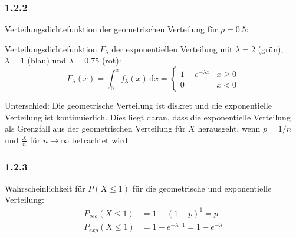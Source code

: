 \subsubsection*{1.2.2}
Verteilungsdichtefunktion der geometrischen Verteilung für $p = 0.5$:
\begin{center}
\end{center}
Verteilungsdichtefunktion $F_\lambda$ der exponentiellen Verteilung mit $\lambda = 2$ (grün), $\lambda = 1$ (blau) und $\lambda = 0.75$ (rot):
\begin{equation*}
    F_{\lambda}(x) = \int_0^x \! f_\lambda(x) \, \mathrm{d}x = \begin{cases} 1 - e^{-\lambda x} & x \geq 0 \\ 0 & x < 0\end{cases} 
\end{equation*}

\vspace{0.5cm}
\begin{center}
\end{center}
Unterschied: Die geometrische Verteilung ist diskret und die exponentielle Verteilung ist kontinuierlich. Dies liegt daran, dass die exponentielle Verteilung als Grenzfall aus der geometrischen Verteilung für $X$ herausgeht, wenn $p=1/n$ und $\frac{X}{n}$ für $n\xrightarrow{}\infty$ betrachtet wird.

\subsubsection*{1.2.3}
Wahrscheinlichkeit für $P(X\leq1)$ für die geometrische und exponentielle Verteilung:
\begin{align*}
P_{geo}(X \leq 1) & = 1-(1-p)^1 = p\\
P_{exp}(X \leq 1) & = 1-e^{-\lambda\cdot1} = 1-e^{-\lambda}
\end{align*}